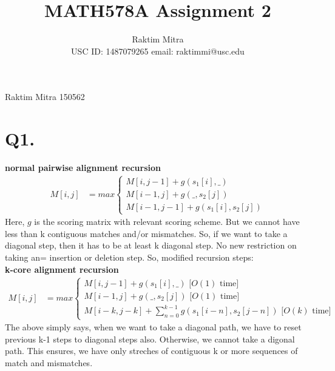 \documentclass[a4paper,11pt]{article}
\begin{document}
\title{MATH578A Assignment 2 }
\author{Raktim Mitra \\ \small{USC ID: 1487079265\hspace{10pt} email: raktimmi@usc.edu}}
\maketitle
{}                              					%
								{Raktim Mitra}      						           		%
								{150562}																		%
								
\section*{Q1. }
\textbf{normal pairwise alignment recursion}\\
\begin{align*}
 M[i,j] &= max\begin{cases}
               M[i,j-1] + g(s_1[i],\_)\\
               M[i-1,j] + g(\_,s_2[j])\\
               M[i-1,j-1] + g(s_1[i],s_2[j])
              \end{cases}
\end{align*}
Here, $g$ is the scoring matrix with relevant scoring scheme. But we cannot have less than k contiguous matches and/or mismatches. So, if  we want to take a diagonal step, then it has to be at least k diagonal step. No new restriction on taking an= insertion or deletion step. So, modified recursion steps:\\
\textbf{k-core alignment recursion}\\
\begin{align*}
 M[i,j] &= max\begin{cases}
               M[i,j-1] + g(s_1[i],\_)\text{ [$O(1)$ time]}\\
               M[i-1,j] + g(\_,s_2[j])\text{ [$O(1)$ time]}\\
               M[i-k,j-k] + \sum_{n=0}^{k-1}g(s_1[i-n],s_2[j-n]) \text{ [$O(k)$ time]}
              \end{cases}
\end{align*}
The above simply says, when we want to take a diagonal path, we have to reset previous k-1 steps to diagonal steps also. Otherwise, we cannot take a digonal path. This ensures, we have only streches of contiguous k or more sequences of match and mismatches.
\end{document}
